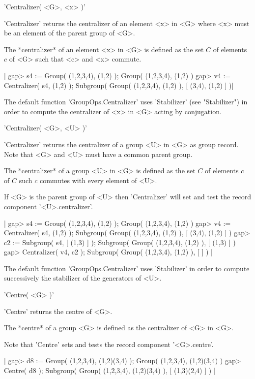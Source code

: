 
'Centralizer( <G>, <x> )'

'Centralizer' returns the centralizer of an element <x> in <G>  where <x>
must be an element of the parent group of <G>.

The *centralizer* of an element <x> in <G>  is defined as the set  $C$ of
elements $c$ of <G> such that <c> and <x> commute.

|    gap> s4 := Group( (1,2,3,4), (1,2) );
    Group( (1,2,3,4), (1,2) )
    gap> v4 := Centralizer( s4, (1,2) );
    Subgroup( Group( (1,2,3,4), (1,2) ), [ (3,4), (1,2) ] )|

The  default    function 'GroupOps.Centralizer'   uses  'Stabilizer' (see
"Stabilizer") in order to compute the centralizer of <x> in <G> acting by
conjugation.

'Centralizer( <G>, <U> )'

'Centralizer'  returns the centralizer  of a group   <U>  in <G> as group
record.  Note that <G> and <U> must have a common parent group.

The *centralizer* of  a group <U> in <G>  is  defined as  the set $C$  of
elements $c$ of $C$ such $c$ commutes with every element of <U>.

If <G> is  the parent group of <U>  then 'Centralizer' will set  and test
the  record   component '<U>.centralizer'.

|    gap> s4 := Group( (1,2,3,4), (1,2) );
    Group( (1,2,3,4), (1,2) )
    gap> v4 := Centralizer( s4, (1,2) );
    Subgroup( Group( (1,2,3,4), (1,2) ), [ (3,4), (1,2) ] )
    gap> c2 := Subgroup( s4, [ (1,3) ] );
    Subgroup( Group( (1,2,3,4), (1,2) ), [ (1,3) ] )
    gap> Centralizer( v4, c2 );
    Subgroup( Group( (1,2,3,4), (1,2) ), [  ] ) |

The default function 'GroupOps.Centralizer' uses 'Stabilizer' in order to
compute successively the stabilizer of the generators of <U>.


'Centre( <G> )'

'Centre' returns the centre of <G>.

The *centre* of a group <G> is defined as the centralizer of <G> in <G>.

Note that 'Centre' sets and tests the record component '<G>.centre'.

|    gap> d8 := Group( (1,2,3,4), (1,2)(3,4) );
    Group( (1,2,3,4), (1,2)(3,4) )
    gap> Centre( d8 );
    Subgroup( Group( (1,2,3,4), (1,2)(3,4) ), [ (1,3)(2,4) ] ) |

